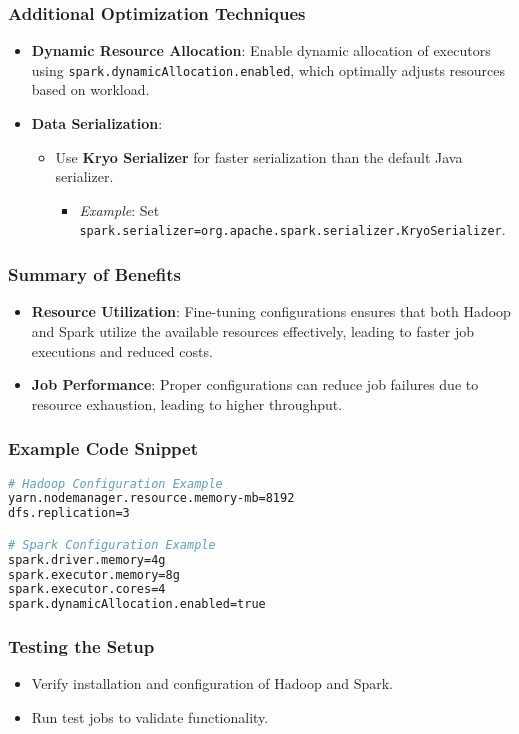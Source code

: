 \documentclass{beamer}
\begin{document}
\begin{frame}[fragile]
    \frametitle{Additional Optimization Techniques}
    \begin{itemize}
        \item \textbf{Dynamic Resource Allocation}: Enable dynamic allocation of executors using \texttt{spark.dynamicAllocation.enabled}, which optimally adjusts resources based on workload.
        \item \textbf{Data Serialization}:
        \begin{itemize}
            \item Use \textbf{Kryo Serializer} for faster serialization than the default Java serializer.
            \begin{itemize}
                \item \textit{Example}: Set \texttt{spark.serializer=org.apache.spark.serializer.KryoSerializer}.
            \end{itemize}
        \end{itemize}
    \end{itemize}
\end{frame}

\begin{frame}[fragile]
    \frametitle{Summary of Benefits}
    \begin{itemize}
        \item \textbf{Resource Utilization}: Fine-tuning configurations ensures that both Hadoop and Spark utilize the available resources effectively, leading to faster job executions and reduced costs.
        \item \textbf{Job Performance}: Proper configurations can reduce job failures due to resource exhaustion, leading to higher throughput.
    \end{itemize}
\end{frame}

\begin{frame}[fragile]
    \frametitle{Example Code Snippet}
    \begin{lstlisting}[language=bash]
# Hadoop Configuration Example
yarn.nodemanager.resource.memory-mb=8192
dfs.replication=3

# Spark Configuration Example
spark.driver.memory=4g
spark.executor.memory=8g
spark.executor.cores=4
spark.dynamicAllocation.enabled=true
    \end{lstlisting}
\end{frame}

\begin{frame}
    \frametitle{Testing the Setup}
    \begin{itemize}
        \item Verify installation and configuration of Hadoop and Spark.
        \item Run test jobs to validate functionality.
    \end{itemize}
\end{frame}
\end{document}
